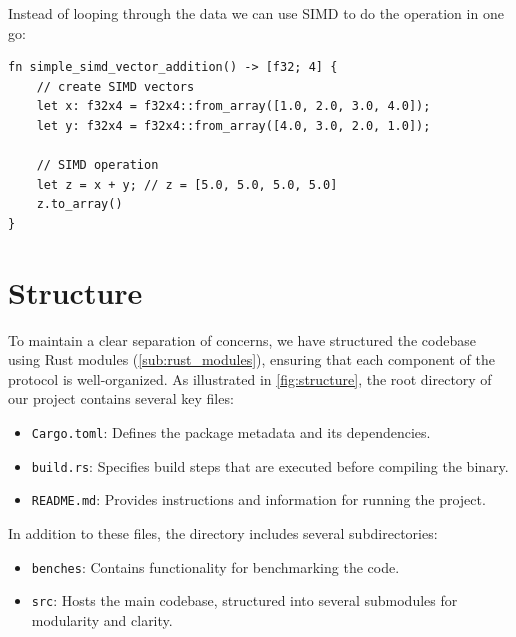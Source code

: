 \documentclass[11pt]{report}
\theoremstyle{definition}
\theoremstyle{plain}
\begin{document}
Instead of looping through the data we can use SIMD to do the operation in one go:

\begin{verbatim}
fn simple_simd_vector_addition() -> [f32; 4] {
    // create SIMD vectors
    let x: f32x4 = f32x4::from_array([1.0, 2.0, 3.0, 4.0]);
    let y: f32x4 = f32x4::from_array([4.0, 3.0, 2.0, 1.0]);

    // SIMD operation
    let z = x + y; // z = [5.0, 5.0, 5.0, 5.0]
    z.to_array()
}
\end{verbatim}



\section{Structure}
To maintain a clear separation of concerns, we have structured the codebase using Rust modules (\autoref{sub:rust_modules}), ensuring that each component of the protocol is well-organized. As illustrated in \autoref{fig:structure}, the root directory of our project contains several key files:

\begin{itemize}
  \item \texttt{Cargo.toml}: Defines the package metadata and its dependencies.
  \item \texttt{build.rs}: Specifies build steps that are executed before compiling the binary.
  \item \texttt{README.md}: Provides instructions and information for running the project.
\end{itemize}

In addition to these files, the directory includes several subdirectories:

\begin{itemize}
  \item \texttt{benches}: Contains functionality for benchmarking the code.
  \item \texttt{src}: Hosts the main codebase, structured into several submodules for modularity and clarity.
\end{itemize}
\end{document}
